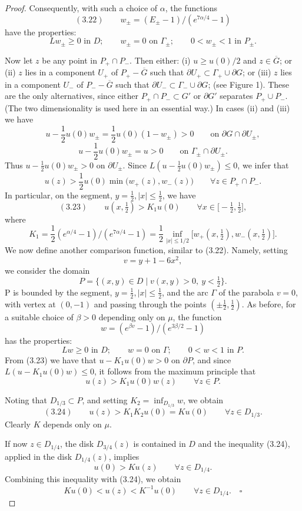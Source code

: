 \begin{proof}

Consequently, with such a choice of $\alpha$, the functions
\[
(3.22)\qquad w_{\pm}=(E_{\pm}-1)/(e^{7\alpha/4}-1)
\]
have the properties:
\[
Lw_{\pm}\ge 0\text{ in }D;\qquad w_{\pm}=0\text{ on }\Gamma_{\pm};\qquad 0<w_{\pm}<1\text{ in }P_{\pm}.
\]

Now let $z$ be any point in $P_{+}\cap P_{-}$. Then either: (i) $u\ge u(0)/2$ and $z\in \overline{G}$; or (ii) $z$ lies in a component $U_{+}$ of $P_{+}-\overline{G}$ such that $\partial U_{+}\subset \Gamma_{+}\cup \partial G$; or (iii) $z$ lies in a component $U_{-}$ of $P_{-}-\overline{G}$ such that $\partial U_{-}\subset \Gamma_{-}\cup \partial G$; (see Figure 1). These are the only alternatives, since either $P_{+}\cap P_{-}\subset G'$ or $\partial G'$ separates $P_{+}\cup P_{-}$. (The two dimensionality is used here in an essential way.) In cases (ii) and (iii) we have
\[
u-\frac{1}{2}u(0)w_{\pm}=\frac{1}{2}u(0)(1-w_{\pm})>0 \qquad \text{on }\partial G\cap \partial U_{\pm},
\]
\[
u-\frac{1}{2}u(0)w_{\pm}=u>0 \qquad \text{on }\Gamma_{\pm}\cap \partial U_{\pm}.
\]
Thus $u-\frac{1}{2}u(0)w_{\pm}>0$ on $\partial U_{\pm}$. Since $L(u-\frac{1}{2}u(0)w_{\pm})\le 0$, we infer that
\[
u(z)>\frac{1}{2}u(0)\min\bigl(w_{+}(z),w_{-}(z)\bigr)\qquad \forall z\in P_{+}\cap P_{-}.
\]
In particular, on the segment, $y=\frac{1}{2}, |x|\le \frac{1}{2}$, we have
\[
(3.23)\qquad u(x,\tfrac{1}{2})>K_{1}u(0)\qquad \forall x\in \bigl[-\tfrac{1}{2},\tfrac{1}{2}\bigr],
\]
where
\[
K_{1}=\frac{1}{2}(e^{\alpha/4}-1)/(e^{7\alpha/4}-1)=\frac{1}{2}\inf_{|x|\le 1/2}\bigl[w_{+}(x,\tfrac{1}{2}),w_{-}(x,\tfrac{1}{2})\bigr].
\]
We now define another comparison function, similar to (3.22). Namely, setting
\[
v=y+1-6x^{2},
\]
we consider the domain
\[
P=\{(x,y)\in D\mid v(x,y)>0,\ y<\tfrac{1}{2}\}.
\]
P is bounded by the segment, $y=\frac{1}{2}, |x|\le \frac{1}{2}$, and the arc $\Gamma$ of the parabola $v=0$, with vertex at $(0,-1)$ and passing through the points $(\pm \tfrac{1}{2},\tfrac{1}{2})$. As before, for a suitable choice of $\beta>0$ depending only on $\mu$, the function
\[
w=(e^{\beta v}-1)/(e^{3\beta/2}-1)
\]
has the properties:
\[
Lw\ge 0\text{ in }D;\qquad w=0\text{ on }\Gamma;\qquad 0<w<1\text{ in }P.
\]
From (3.23) we have that $u-K_{1}u(0)w>0$ on $\partial P$, and since $L(u-K_{1}u(0)w)\le 0$, it follows from the maximum principle that
\[
u(z)>K_{1}u(0)w(z)\qquad \forall z\in P.
\]


Noting that $D_{1/3}\subset P$, and setting $K_2=\inf_{D_{1/3}} w$, we obtain
\[
(3.24)\qquad u(z)>K_1K_2u(0)=Ku(0)\qquad \forall z\in D_{1/3}.
\]
Clearly $K$ depends only on $\mu$.

If now $z\in D_{1/4}$, the disk $D_{3/4}(z)$ is contained in $D$ and the inequality (3.24), applied in the disk $D_{1/4}(z)$, implies
\[
u(0)>Ku(z)\qquad \forall z\in D_{1/4}.
\]
Combining this inequality with (3.24), we obtain
\[
Ku(0)<u(z)<K^{-1}u(0)\qquad \forall z\in D_{1/4}. \quad \square
\]
\end{proof}
